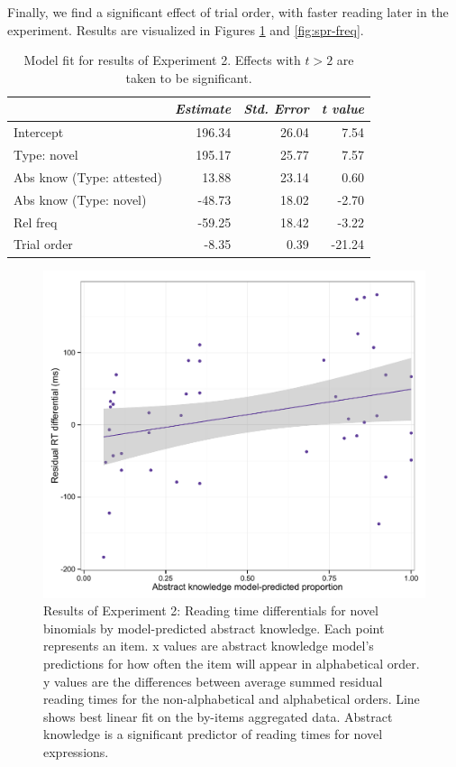 \documentclass[authoryear]{elsarticle}
\begin{document}
Finally, we find a significant effect of trial order, with faster reading later in the experiment. Results are visualized in Figures \ref{fig:spr-model} and \ref{fig:spr-freq}.

\begin{table}[t]
\centering
\begin{tabular}{ l  r  r  r  }
\hline\hline
 & \emph{Estimate} &\emph{Std. Error} & \emph{t value}  \\\hline    
Intercept   &  196.34   &  26.04   & 7.54\\ 
Type: novel & 195.17 &    25.77  & 7.57\\ 
Abs know (Type: attested)      &   13.88    & 23.14  &  0.60\\ 
Abs know (Type: novel) & -48.73 &     18.02 &  -2.70 \\ 
Rel freq &  -59.25  &   18.42  & -3.22\\ 
Trial order &           -8.35   &   0.39 & -21.24\\\hline 
\end{tabular}
\caption{Model fit for results of Experiment 2. Effects with $t>2$ are taken to be significant.}\label{t:spr-all}
\end{table}


\begin{figure}[t]
\includegraphics[scale=0.87]{spr-results.pdf}
\caption{Results of Experiment 2: Reading time differentials for novel binomials by model-predicted abstract knowledge. Each point represents an item. x values are abstract knowledge model's predictions for how often the item will appear in alphabetical order. y values are the differences between average summed residual reading times for the non-alphabetical and alphabetical orders. Line shows best linear fit on the by-items aggregated data. Abstract knowledge is a significant predictor of reading times for novel expressions.} \label{fig:spr-model}
\end{figure}
\end{document}

